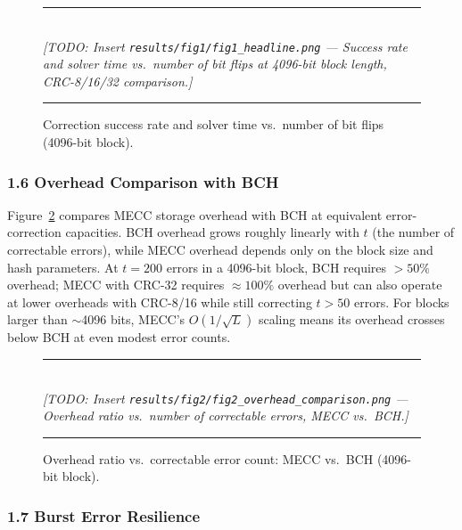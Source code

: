 \begin{figure}[h]
\centering
\rule{0.85\textwidth}{0.4pt}\\[6pt]
\textit{[TODO: Insert \texttt{results/fig1/fig1\_headline.png} --- Success rate and solver time vs.\ number of bit flips at 4096-bit block length, CRC-8/16/32 comparison.]}\\[6pt]
\rule{0.85\textwidth}{0.4pt}
\caption{Correction success rate and solver time vs.\ number of bit flips (4096-bit block).}
\label{fig:headline}
\end{figure}

\subsubsection*{1.6 Overhead Comparison with BCH}

Figure~\ref{fig:overhead} compares MECC storage overhead with BCH at equivalent error-correction capacities.
BCH overhead grows roughly linearly with $t$ (the number of correctable errors), while MECC overhead depends only on the block size and hash parameters.
At $t = 200$ errors in a 4096-bit block, BCH requires $> 50\%$ overhead; MECC with CRC-32 requires $\approx 100\%$ overhead but can also operate at lower overheads with CRC-8/16 while still correcting $t > 50$ errors.
For blocks larger than $\sim$4096 bits, MECC's $O(1/\sqrt{L})$ scaling means its overhead crosses below BCH at even modest error counts.

\begin{figure}[h]
\centering
\rule{0.85\textwidth}{0.4pt}\\[6pt]
\textit{[TODO: Insert \texttt{results/fig2/fig2\_overhead\_comparison.png} --- Overhead ratio vs.\ number of correctable errors, MECC vs.\ BCH.]}\\[6pt]
\rule{0.85\textwidth}{0.4pt}
\caption{Overhead ratio vs.\ correctable error count: MECC vs.\ BCH (4096-bit block).}
\label{fig:overhead}
\end{figure}

\subsubsection*{1.7 Burst Error Resilience}

